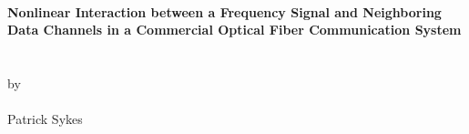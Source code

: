\thispagestyle{empty}
\hbox{\ }
\vspace{1in}
\renewcommand{\baselinestretch}{1}
\small\normalsize
\begin{center}

\textbf{\large{{Nonlinear Interaction between a Frequency Signal and Neighboring Data Channels in a Commercial Optical Fiber Communication System}}}\\
\ \\
\ \\
\large{by} \\
\ \\
\large{Patrick Sykes}%
\ \\
\ \\
\ \\
\ \\
\normalsize
\end{center}

\vspace{7.5em}
